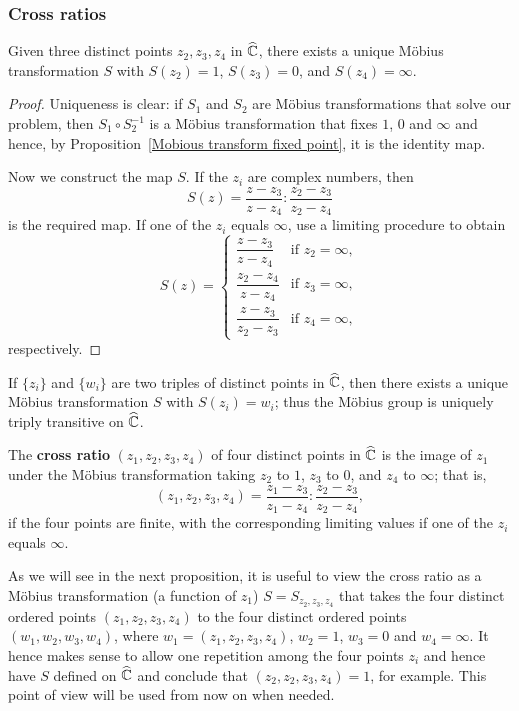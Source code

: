 \subsubsection{Cross ratios}
\begin{proposition}
Given three distinct points $z_2,z_3,z_4$ in $\widehat{\mathbb{C}}$, there exists a unique M\"obius transformation $S$ with $S(z_2)=1$, $S(z_3)=0$, and $S(z_4)=\infty$.
\end{proposition}
\begin{proof}
Uniqueness is clear: if $S_1$ and $S_2$ are M\"obius transformations that solve our problem, then $S_1\circ S_2^{-1}$ is a M\"obius transformation that fixes $1$, $0$ and $\infty$ and hence, by Proposition~\ref{Mobious transform fixed point}, it is the identity map.\par
Now we construct the map $S$. If the $z_i$ are complex numbers, then
\[S(z)=\frac{z-z_3}{z-z_4}:\frac{z_2-z_3}{z_2-z_4}\]
is the required map. If one of the $z_i$ equals $\infty$, use a limiting procedure to obtain
\[S(z)=\begin{cases}
\dfrac{z-z_3}{z-z_4}&\text{if $z_2=\infty$},\\[8pt]
\dfrac{z_2-z_4}{z-z_4}&\text{if $z_3=\infty$},\\[8pt]
\dfrac{z-z_3}{z_2-z_3}&\text{if $z_4=\infty$},
\end{cases}\]
respectively.
\end{proof}
\begin{corollary}
If $\{z_i\}$ and $\{w_i\}$ are two triples of distinct points in $\widehat{\mathbb{C}}$, then there exists a unique M\"obius transformation $S$ with $S(z_i)=w_i$; thus the M\"obius group is uniquely triply transitive on $\widehat{\mathbb{C}}$.
\end{corollary}
\begin{definition}
The \textbf{cross ratio} $(z_1,z_2,z_3,z_4)$ of four distinct points in $\widehat{\mathbb{C}}$ is the image of $z_1$ under the M\"obius transformation taking $z_2$ to $1$, $z_3$ to $0$, and $z_4$ to $\infty$; that is,
\[(z_1,z_2,z_3,z_4)=\frac{z_1-z_3}{z_1-z_4}:\frac{z_2-z_3}{z_2-z_4},\]
if the four points are finite, with the corresponding limiting values if one of the $z_i$ equals $\infty$.
\end{definition}
As we will see in the next proposition, it is useful to view the cross ratio as a M\"obius transformation (a function of $z_1$) $S=S_{z_2,z_3,z_4}$ that takes the four distinct ordered points $(z_1,z_2,z_3,z_4)$ to the four distinct ordered points $(w_1,w_2,w_3,w_4)$, where $w_1=(z_1,z_2,z_3,z_4)$, $w_2=1$, $w_3=0$ and $w_4=\infty$. It hence makes sense to allow one repetition among the four points $z_i$ and hence have $S$ defined on $\widehat{\mathbb{C}}$ and conclude that $(z_2,z_2,z_3,z_4)=1$, for example. This point of view will be used from now on when needed.
